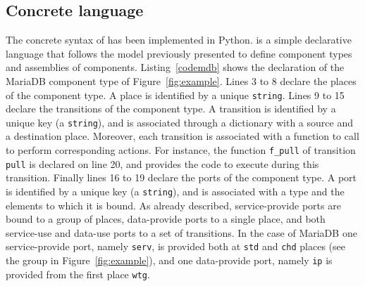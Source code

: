 
\subsection{Concrete language}

The concrete syntax of \mad has been implemented in Python. \mad is a
simple declarative language that follows the model previously
presented to define component types and assemblies of
components. Listing~\ref{codemdb} shows the declaration of the MariaDB
component type of Figure~\ref{fig:example}. Lines 3 to 8 declare
the places of the component type. A place is
identified by a unique \texttt{string}. Lines 9 to 15
declare the transitions of the component type. A transition is
identified by a unique key (a \texttt{string}), and is associated
through a dictionary with a source and a destination place. Moreover,
each transition is associated with a function to call to perform
corresponding actions. For instance, the function \texttt{f\_pull} of
transition \texttt{pull} is declared on line 20, and provides the code
to execute during this transition. Finally lines 16 to 19 declare the
ports of the component type. A port is identified by a unique key (a
\texttt{string}), and is associated with a type and the elements to
which it is bound. As already described, service-provide ports are
bound to a group of places, data-provide ports to a single place, and
both service-use and data-use ports to a set of transitions. In the
case of MariaDB one service-provide port, namely \texttt{serv}, is
provided both at \texttt{std} and \texttt{chd} places (see the group
in Figure~\ref{fig:example}), and one data-provide port, namely
\texttt{ip} is provided from the first place \texttt{wtg}.



